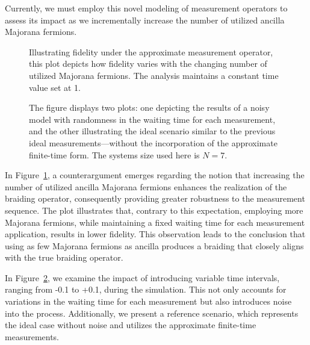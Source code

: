 \documentclass{article}
\begin{document}
Currently, we must employ this novel modeling of measurement operators to assess its impact as we incrementally increase the number of utilized ancilla Majorana fermions.
\begin{figure}
	\begin{center}
		
	\end{center}
	\caption{Illustrating fidelity under the approximate measurement operator, this plot depicts how fidelity varies with the changing number of utilized Majorana fermions. The analysis maintains a constant time value set at 1.}
	\label{fig:fid vs N t=1}
\end{figure}
\begin{figure}
	\begin{center}
		
	\end{center}
	\caption{The figure displays two plots: one depicting the results of a noisy model with randomness in the waiting time for each measurement, and the other illustrating the ideal scenario similar to the previous ideal measurements—without the incorporation of the approximate finite-time form. The systems size used here is $ N=7 $.}
	\label{fig:fid vs dt N=7}
\end{figure}
In Figure~\ref{fig:fid vs N t=1}, a counterargument emerges regarding the notion that increasing the number of utilized ancilla Majorana fermions enhances the realization of the braiding operator, consequently providing greater robustness to the measurement sequence. The plot illustrates that, contrary to this expectation, employing more Majorana fermions, while maintaining a fixed waiting time for each measurement application, results in lower fidelity. This observation leads to the conclusion that using as few Majorana fermions as ancilla produces a braiding that closely aligns with the true braiding operator.

In Figure~\ref{fig:fid vs dt N=7}, we examine the impact of introducing variable time intervals, ranging from -0.1 to +0.1, during the simulation. This not only accounts for variations in the waiting time for each measurement but also introduces noise into the process. Additionally, we present a reference scenario, which represents the ideal case without noise and utilizes the approximate finite-time measurements.
\end{document}
